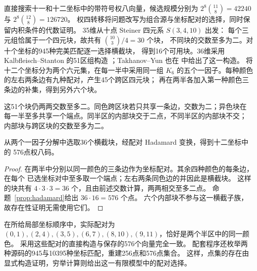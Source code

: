 直接搜索十一和十二坐标中的带符号权八向量，候选规模分别为
$2^8\binom{11}{8}=42240$ 与 $2^8\binom{12}{8}=126720$。
权四转移将问题改写为组合源与坐标配对的选择，同时保留内积条件的代数证明。
35维从十点 Steiner 四元系 $S(3,4,10)$ 出发：
每个三元组恰属于一个四元块，故共有 $\binom{10}{3}/4=30$ 个块，
不同块的交数至多为二。对十个坐标的945种完美匹配逐一选择横截块，
得到16个可用块。36维采用 Kalbfleisch--Stanton 的51区组构造
\cite[定理7]{kalbfleisch-stanton}；Takhanov--Yun 也在
\cite[第V节，构造1]{signed-johnson}中给出了这一构造。
将十二个坐标分为两个六元集，在每一半中采用同一组
$K_6$ 的五个一因子。每种颜色的左右两条边有九种配对，产生45个跨区四元块；
再在两半各加入第一种颜色三条边的补集，得到另外六个块。

这51个块仍两两交数至多二。同色跨区块若只共享一条边，交数为二；异色块在
每一半至多共享一个端点。同半区的内部块交于二点，不同半区的内部块不交；
内部块与跨区块的交数至多为二。

\begin{proposition}[576点局部码]
\label{prop:local36}
从两个一因子分解中选取36个横截块，经配对 Hadamard 变换，得到十二坐标中的
576点权八码。
\end{proposition}
\begin{proof}
在两半中分别以同一颜色的三条边作为坐标配对。其余四种颜色的每条边，在每个
已选坐标对中至多取一个端点；左右两条同色边的并因此是横截块。
这样的块共有 $4\cdot3\cdot3=36$ 个，且由前述交数计算，两两相交至多二点。
命题~\ref{prop:hadamard}给出 $36\cdot16=576$ 个点。
六个内部块不参与这一横截子族，故存在性证明无需使用它们。
\end{proof}

在所给局部坐标顺序中，实际配对为
$(0,1),(2,4),(3,5),(6,7),(8,10),(9,11)$，恰好是两个半区中的同一颜色。
采用这些配对的直接构造与保存的576个向量完全一致。
配套程序还枚举两种源码的945与10395种坐标匹配，重建256点和576点集合。
这样，点集的存在由显式构造证明，穷举计算则给出这一有限模型中的配对选择。

